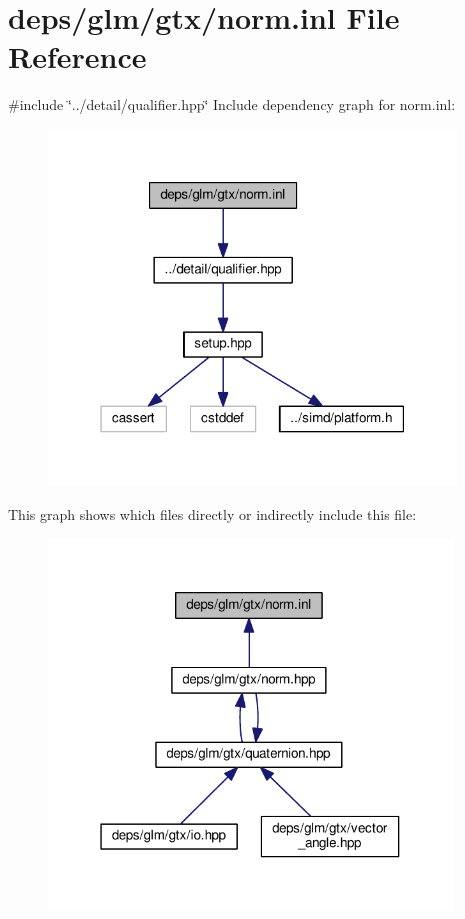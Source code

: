 \hypertarget{norm_8inl}{}\section{deps/glm/gtx/norm.inl File Reference}
\label{norm_8inl}
{\ttfamily \#include \char`\"{}../detail/qualifier.\+hpp\char`\"{}}\newline
Include dependency graph for norm.\+inl\+:
\nopagebreak
\begin{figure}[H]
\begin{center}
\leavevmode
\includegraphics[width=307pt]{d7/d68/norm_8inl__incl}
\end{center}
\end{figure}
This graph shows which files directly or indirectly include this file\+:
\nopagebreak
\begin{figure}[H]
\begin{center}
\leavevmode
\includegraphics[width=304pt]{d5/dfe/norm_8inl__dep__incl}
\end{center}
\end{figure}
